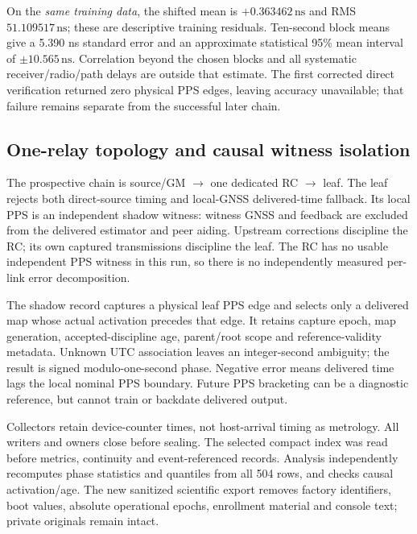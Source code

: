 \documentclass[11pt,letterpaper]{article}
\newcommand{\ns}{\,\mathrm{ns}}\newcommand{\us}{\,\mu\mathrm{s}}\newcommand{\ms}{\,\mathrm{ms}}\newcommand{\ppb}{\,\mathrm{ppb}}\newcommand{\code}[1]{\texttt{#1}}\newcolumntype{L}[1]{>{\RaggedRight\arraybackslash}p{#1}}
\begin{document}
On the \emph{same training data}, the shifted mean is $+0.363462\ns$ and RMS $51.109517\ns$; these are descriptive training residuals. Ten-second block means give a 5.390 ns standard error and an approximate statistical 95\% mean interval of $\pm10.565\ns$. Correlation beyond the chosen blocks and all systematic receiver/radio/path delays are outside that estimate. The first corrected direct verification returned zero physical PPS edges, leaving accuracy unavailable; that failure remains separate from the successful later chain.

\subsection{One-relay topology and causal witness isolation}
The prospective chain is source/GM $\rightarrow$ one dedicated RC $\rightarrow$ leaf. The leaf rejects both direct-source timing and local-GNSS delivered-time fallback. Its local PPS is an independent shadow witness: witness GNSS and feedback are excluded from the delivered estimator and peer aiding. Upstream corrections discipline the RC; its own captured transmissions discipline the leaf. The RC has no usable independent PPS witness in this run, so there is no independently measured per-link error decomposition.

The shadow record captures a physical leaf PPS edge and selects only a delivered map whose actual activation precedes that edge. It retains capture epoch, map generation, accepted-discipline age, parent/root scope and reference-validity metadata. Unknown UTC association leaves an integer-second ambiguity; the result is signed modulo-one-second phase. Negative error means delivered time lags the local nominal PPS boundary. Future PPS bracketing can be a diagnostic reference, but cannot train or backdate delivered output.

Collectors retain device-counter times, not host-arrival timing as metrology. All writers and owners close before sealing. The selected compact index was read before metrics, continuity and event-referenced records. Analysis independently recomputes phase statistics and quantiles from all 504 rows, and checks causal activation/age. The new sanitized scientific export removes factory identifiers, boot values, absolute operational epochs, enrollment material and console text; private originals remain intact.
\end{document}
